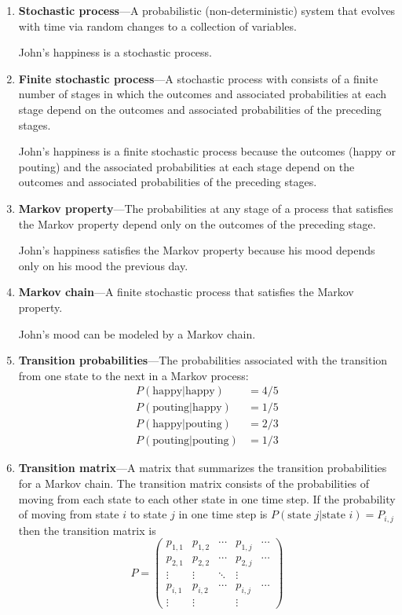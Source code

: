 \documentclass[letterpaper,12pt]{article}
\begin{document}
\begin{enumerate}

\item \textbf{Stochastic process}---A probabilistic (non-deterministic) system that evolves with time via random changes to a collection of variables.

John's happiness is a stochastic process. 

\item \textbf{Finite stochastic process}---A stochastic process with consists of a finite number of stages in which the outcomes and associated probabilities at each stage depend on the outcomes and associated probabilities of the preceding stages.

John's happiness is a finite stochastic process because the outcomes (happy or pouting) and the associated probabilities at each stage depend on the outcomes and associated probabilities of the preceding stages. 

\item \textbf{Markov property}---The probabilities at any stage of a process that satisfies the Markov property depend only on the outcomes of the preceding stage.

John's happiness satisfies the Markov property because his mood depends only on his mood the previous day. 

\item \textbf{Markov chain}---A finite stochastic process that satisfies the Markov property.

John's mood can be modeled by a Markov chain.

\item \textbf{Transition probabilities}---The probabilities associated with the transition from one state to the next in a Markov process:
\begin{align*}
P(\mbox{happy} | \mbox{happy} ) &= 4/5 \\
P(\mbox{pouting} | \mbox{happy}) &= 1/5 \\
P(\mbox{happy} | \mbox{pouting}) &= 2/3 \\
P(\mbox{pouting} | \mbox{pouting}) &= 1/3
\end{align*}

\item \textbf{Transition matrix}---A matrix that summarizes the transition probabilities for a Markov chain. The transition matrix consists of the probabilities of moving from each state to each other state in one time step. If the probability of moving from state $i$ to state $j$ in one time step is $P(\mbox{state }j | \mbox{state }i) = P_{i, j}$ then the transition matrix is
\[
P = \left( \begin{array}{ccccc}
p_{1,1} & p_{1,2} & \cdots & p_{1, j} & \cdots \\
p_{2,1} & p_{2,2} & \cdots & p_{2, j} & \cdots \\
\vdots & \vdots & \ddots & \vdots & \\
p_{i, 1} & p_{i, 2} & \cdots & p_{i, j} & \cdots \\
\vdots & \vdots & & \vdots & \end{array} \right)
\]


\end{enumerate}
\end{document}
